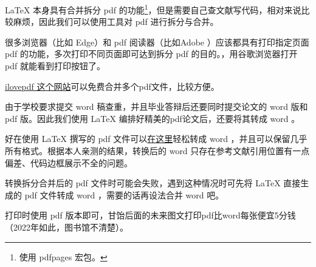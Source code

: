 \LaTeX{} 本身具有合并拆分 pdf 的功能\footnote{使用 pdfpages 宏包。}，但是需要自己查文献写代码，相对来说比较麻烦，因此我们可以使用工具对 pdf 进行拆分与合并。

很多浏览器（比如 Edge）和 pdf 阅读器（比如Adobe ）应该都具有打印指定页面 pdf 的功能，多次打印不同页面即可达到拆分 pdf 的目的。，用谷歌浏览器打开 pdf 就能看到打印按钮了。

\href{https://www.ilovepdf.com/zh-cn/merge_pdf}{ilovepdf 这个网站}可以免费合并多个pdf文件，比较方便。

由于学校要求提交 word 稿查重，并且毕业答辩后还要同时提交论文的 word 版和 pdf 版。因此我们使用 \LaTeX{} 编排好精美的pdf论文后，还要将其转成 word 。

好在使用 \LaTeX{} 撰写的 pdf 文件可以\href{https://www.pdfwordconvert.com/zh/convertform}{在这里}轻松转成 word ，并且可以保留几乎所有格式。根据本人亲测的结果，转换后的 word 只存在参考文献引用位置有一点偏差、代码边框展示不全的问题。

转换拆分合并后的 pdf 文件时可能会失败，遇到这种情况时可先将 \LaTeX{} 直接生成的 pdf 文件转成 word ，需要的话再设法合并 word 吧。

打印时使用 pdf 版本即可，甘饴后面的未来图文打印pdf比word每张便宜5分钱（2022年如此，图书馆不清楚）。


\label{chap:模板使用说明:end}

\let\filename\undefined
\let\hltext\undefined
